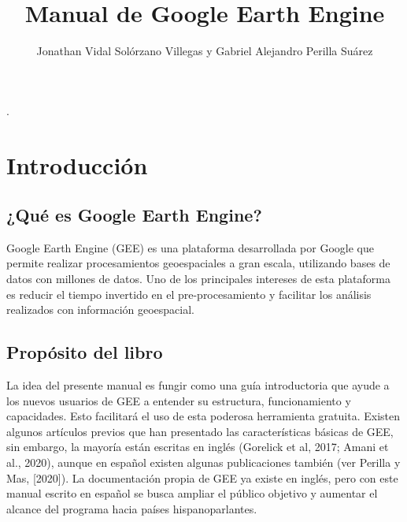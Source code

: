\documentclass[
  12pt,
  letterpaper,
  twoside]{book}
\title{Manual de Google Earth Engine}
\author{Jonathan Vidal Solórzano Villegas y Gabriel Alejandro Perilla Suárez}
\date{}
\renewcommand\headrulewidth{0pt}
\begin{document}
\maketitle

\renewcommand*\contentsname{Índice}
{
\hypersetup{linkcolor=black}
\setcounter{tocdepth}{1}
\tableofcontents
}
\setlength{\aweboxleftmargin}{0.1\linewidth}.
\setlength{\aweboxcontentwidth}{0.85\linewidth}
\setlength{\aweboxvskip}{1mm}
\setlength{\aweboxrulewidth}{5pt}

\newpage
\mainmatter

\renewcommand\headrulewidth{1pt}
\pagestyle{fancy} 
  \fancyfoot{}
  \fancyfoot[LE,RO]{\thepage}
  \fancyhead{}
  \fancyhead[LE,RO]{\leftmark}
  \fancyhead[LO,RE]{\rightmark}

\hypertarget{introducciuxf3n}{%
\chapter{Introducción}\label{introducciuxf3n}}

\hypertarget{quuxe9-es-google-earth-engine}{%
\section{¿Qué es Google Earth Engine?}\label{quuxe9-es-google-earth-engine}}

Google Earth Engine (GEE) es una plataforma desarrollada por Google que permite realizar procesamientos geoespaciales a gran escala, utilizando bases de datos con millones de datos. Uno de los principales intereses de esta plataforma es reducir el tiempo invertido en el pre-procesamiento y facilitar los análisis realizados con información geoespacial.

\hypertarget{propuxf3sito-del-libro}{%
\section{Propósito del libro}\label{propuxf3sito-del-libro}}

La idea del presente manual es fungir como una guía introductoria que ayude a los nuevos usuarios de GEE a entender su estructura, funcionamiento y capacidades. Esto facilitará el uso de esta poderosa herramienta gratuita. Existen algunos artículos previos que han presentado las características básicas de GEE, sin embargo, la mayoría están escritas en inglés (Gorelick et al, 2017; Amani et al., 2020), aunque en español existen algunas publicaciones también (ver Perilla y Mas, {[}2020{]}). La documentación propia de GEE ya existe en inglés, pero con este manual escrito en español se busca ampliar el público objetivo y aumentar el alcance del programa hacia países hispanoparlantes.
\end{document}
